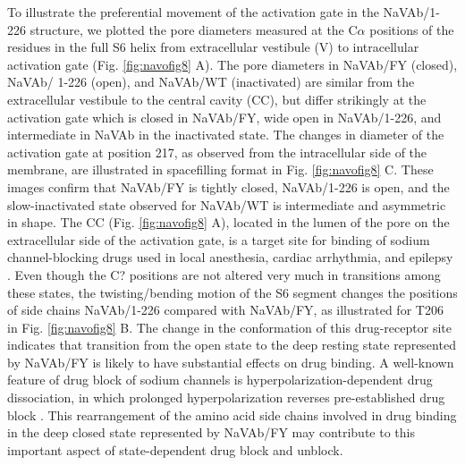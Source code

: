 \begin{refsection}
{To illustrate the preferential movement of the activation gate in the NaVAb/1-226 structure, we plotted the pore diameters measured at the C$\alpha$ positions of the residues in the full S6 helix from extracellular vestibule (V) to intracellular activation gate (Fig. \ref{fig:navofig8} A). The pore diameters in NaVAb/FY (closed), NaVAb/ 1-226 (open), and NaVAb/WT (inactivated) are similar from the extracellular vestibule to the central cavity (CC), but differ strikingly at the activation gate which is closed in NaVAb/FY, wide open in NaVAb/1-226, and intermediate in NaVAb in the inactivated state. The changes in diameter of the activation gate at position 217, as observed from the intracellular side of the membrane, are illustrated in spacefilling format in Fig. \ref{fig:navofig8} C. These images confirm that NaVAb/FY is tightly closed, NaVAb/1-226 is open, and the slow-inactivated state observed for NaVAb/WT \cite{Payandeh:2013ex} is intermediate and asymmetric in shape. The CC (Fig. \ref{fig:navofig8} A), located in the lumen of the pore on the extracellular side of the activation gate, is a target site for binding of sodium channel-blocking drugs used in local anesthesia, cardiac arrhythmia, and epilepsy \cite{Payandeh:2012ib}. Even though the C? positions are not altered very much in transitions among these states, the twisting/bending motion of the S6 segment changes the positions of side chains NaVAb/1-226 compared with NaVAb/FY, as illustrated for T206 in Fig. \ref{fig:navofig8} B. The change in the conformation of this drug-receptor site indicates that transition from the open state to the deep resting state represented by NaVAb/FY is likely to have substantial effects on drug binding. A well-known feature of drug block of sodium channels is hyperpolarization-dependent drug dissociation, in which prolonged hyperpolarization reverses pre-established drug block \cite{Hille:1977td,Courtney:1975uu}. This rearrangement of the amino acid side chains involved in drug binding in the deep closed state represented by NaVAb/FY may contribute to this important aspect of state-dependent drug block and unblock.


}
\end{refsection}
